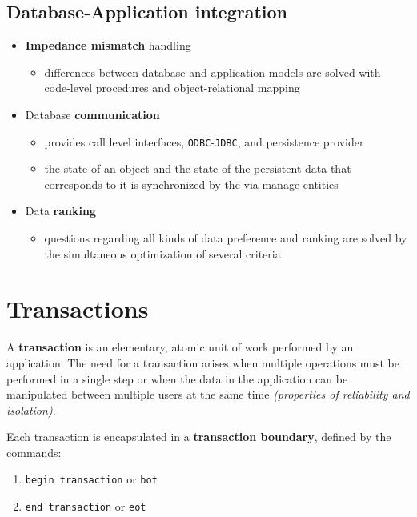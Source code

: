 \documentclass[english]{article}
\begin{document}
\subsection{Database-Application integration}

\begin{itemize}
  \item \textbf{Impedance mismatch} handling
        \begin{itemize}[label=\(\rightarrow\)]
          \item differences between database and application models are solved with code-level procedures and object-relational mapping
        \end{itemize}
  \item Database \textbf{communication}
        \begin{itemize}[label=\(\rightarrow\)]
          \item \dbms provides call level interfaces, \texttt{ODBC}-\texttt{JDBC}, and \jpa persistence provider
          \item the state of an object and the state of the persistent data that corresponds to it is synchronized by the \dbms via \jpa manage entities
        \end{itemize}
  \item Data \textbf{ranking}
        \begin{itemize}[label=\(\rightarrow\)]
          \item questions regarding all kinds of data preference and ranking are solved by the simultaneous optimization of several criteria
        \end{itemize}
\end{itemize}

\clearpage

\section{Transactions}

A \textbf{transaction} is an elementary, atomic unit of work performed by an application.
The need for a transaction arises when multiple operations must be performed in a single step or when the data in the application can be manipulated between multiple users at the same time \textit{(properties of reliability and isolation)}.

Each transaction is encapsulated in a \textbf{transaction boundary}, defined by the commands:

\begin{enumerate}
  \item \texttt{begin transaction} or \texttt{bot}
  \item \texttt{end transaction} or \texttt{eot}
\end{enumerate}
\end{document}
